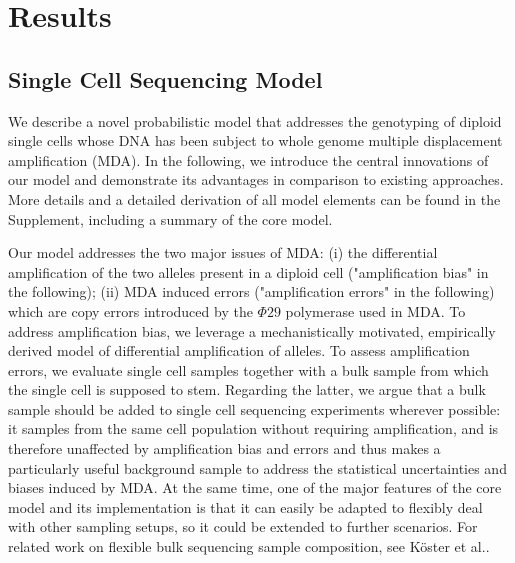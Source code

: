 \documentclass[fleqn,12pt,inline]{wlscirep}
\begin{document}
\section{Results}

\subsection{Single Cell Sequencing Model}

We describe a novel probabilistic model that addresses the genotyping of diploid single cells whose DNA has been subject to whole genome multiple displacement amplification (MDA)\cite{dean_comprehensive_2002}.
In the following, we introduce the central innovations of our model and demonstrate its advantages in comparison to existing approaches.
More details and a detailed derivation of all model elements can be found in the Supplement, including a summary of the core model.

Our model addresses the two major issues of MDA: (i) the differential amplification of the two alleles present in a diploid cell ("amplification bias" in the following); (ii) MDA induced errors ("amplification errors" in the following) which are copy errors introduced by the $\Phi29$ polymerase used in MDA. To address amplification bias, we leverage a mechanistically motivated, empirically derived model of differential amplification of alleles.
To assess amplification errors, we evaluate single cell samples together with a bulk sample from which the single cell is supposed to stem.
Regarding the latter, we argue that a bulk sample should be added to single cell sequencing experiments wherever possible: it samples from the same cell population without requiring amplification, and is therefore unaffected by amplification bias and errors and thus makes a particularly useful background sample to address the statistical uncertainties and biases induced by MDA.
At the same time, one of the major features of the core model and its implementation is that it can easily be adapted to flexibly deal with other sampling setups, so it could be extended to further scenarios.
For related work on flexible bulk sequencing sample composition, see Köster et al.\cite{koster_enhancing_2019}.
\end{document}
